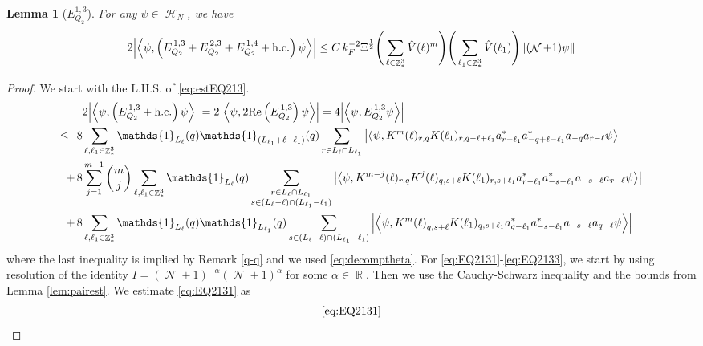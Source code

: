 \documentclass[sn-mathphys, Numbered ,a4paper]{sn-jnl}%
\DeclareMathOperator{\R}{\mathbb{R}}
\DeclareMathOperator{\Z}{\mathbb{Z}}
\DeclareMathOperator{\HH}{\mathcal{H}}
\DeclareMathOperator{\NN}{\mathcal{N}}
\newcommand{\half}{\frac{1}{2}}
\newcommand{\eva}[1]{\left\langle #1 \right\rangle}
\theoremstyle{plain}
\newtheorem{lemma}[theorem]{Lemma}
\theoremstyle{definition}
\theoremstyle{remark}
\theoremstyle{plain}
\theoremstyle{definition}
\theoremstyle{remark}
\begin{document}
\begin{lemma}[$E_{Q_2}^{1,3}$]
For any $\psi \in \HH_N$, we have
\begin{equation}
	2\abs{\eva{\psi,\left(E^{\,1,3}_{Q_2}+E^{\,2,3}_{Q_2}+E^{\,1,4}_{Q_2}+\mathrm{h.c.}\right) \psi }} 
	\leq  C\, k_{F}^{-2} \Xi^{\half} \Bigg(\sum\limits_{\ell \in \Z^3_*} \hat{V}(\ell)^m \Bigg) \Bigg( \sum\limits_{\ell_1 \in \Z^3_*}\hat{V}(\ell_1) \Bigg)  \norm { (\NN+1) \psi }    \label{eq:estEQ213}
\end{equation}
\end{lemma}
\begin{proof}
We start with the L.H.S. of \eqref{eq:estEQ213}.
\begin{align}
	&2\abs{\eva{\psi,\left(E^{\,1,3}_{Q_2}+\mathrm{h.c.}\right) \psi }} = 2\abs{\eva{\psi,2\mathrm{Re}\left(E^{\,1,3}_{Q_2}\right) \psi }} = 4\abs{\eva{\psi, E^{\,1,3}_{Q_2} \psi }}\nonumber\\
    \leq\,\;8& \sum\limits_{\ell, \ell_1\in \Z^3_*} \mathds{1}_{L_{\ell}}(q) \mathds{1}_{(L_{\ell_1}+\ell-\ell_1)}(q) \sum\limits_{r\in L_{\ell} \cap L_{\ell_1}} \abs{\eva{\psi, K^m(\ell)_{r,q}K(\ell_1)_{r,q-\ell+\ell_1}a^*_{r-\ell_1}a^*_{-q+\ell-\ell_1} a_{-q}a_{r-\ell} \psi }}\label{eq:EQ2131}\\
    +\,8& \sum\limits_{j=1}^{m-1} {{m}\choose j} \sum\limits_{\ell, \ell_1\in \Z^3_*}\mathds{1}_{L_{\ell}}(q) \sum\limits_{\substack{r\in L_{\ell} \cap L_{\ell_1}\\ s \in (L_{\ell}-\ell) \cap (L_{\ell_1}-\ell_1)}}  \abs{\eva{\psi, K^{m-j}(\ell)_{r,q} K^{j}(\ell)_{q,s+\ell} K(\ell_1)_{r,s+\ell_1}a^*_{r-\ell_1}a^*_{-s-\ell_1} a_{-s-\ell}a_{r-\ell}  \psi }}\label{eq:EQ2132}\\
    +\,8&\sum\limits_{\ell, \ell_1\in \Z^3_*} \mathds{1}_{L_{\ell}}(q) \mathds{1}_{L_{\ell_1}}(q) \sum\limits_{ s \in (L_{\ell}-\ell) \cap (L_{\ell_1}-\ell_1)} \abs{\eva{\psi, K^m{(\ell)}_{q,s+\ell} K(\ell_1)_{q,s+\ell_1} a^*_{q-\ell_1} a^*_{-s-\ell_1} a_{-s-\ell} a_{q-\ell} \psi }}\label{eq:EQ2133}
\end{align}
where the last inequality is implied by Remark \ref{q-q} and we used \eqref{eq:decomptheta}.
For \eqref{eq:EQ2131}-\eqref{eq:EQ2133}, we start by using resolution of the identity $I = (\NN+1)^{-\alpha}(\NN+1)^{\alpha}$ for some $\alpha \in \R$. Then we use the Cauchy-Schwarz inequality and the bounds from Lemma \ref{lem:pairest}.
We estimate \eqref{eq:EQ2131} as
\begin{alignat}{2}
    &\eqref{eq:EQ2131}\nonumber\\

\end{alignat}
\end{proof}
\end{document}
